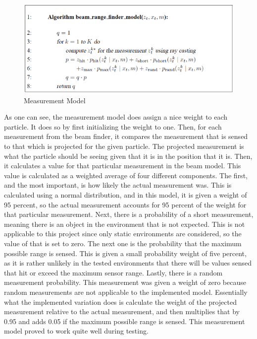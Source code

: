 \documentclass{article}
\begin{document}
\begin{figure}[h!]
\centering
\includegraphics[scale=0.70]{range_algorithm.PNG}
\caption{Measurement Model}
\label{fig:range}
\end{figure}

As one can see, the measurement model does assign a nice weight to each particle. It does so by first initializing the weight to one. Then, for each measurement from the beam finder, it compares the measurement that is sensed to that which is projected for the given particle. The projected measurement is what the particle should be seeing given that it is in the position that it is. Then, it calculates a value for that particular measurement in the beam model. This value is calculated as a weighted average of four different components. The first, and the most important, is how likely the actual measurement was. This is calculated using a normal distribution, and in this model, it is given a weight of 95 percent, so the actual measurement accounts for 95 percent of the weight for that particular measurement. Next, there is a probability of a short measurement, meaning there is an object in the environment that is not expected. This is not applicable to this project since only static environments are considered, so the value of that is set to zero. The next one is the probability that the maximum possible range is sensed. This is given a small probability weight of five percent, as it is rather unlikely in the tested environments that there will be values sensed that hit or exceed the maximum sensor range. Lastly, there is a random measurement probability. This measurement was given a weight of zero because random measurements are not applicable to the implemented model. Essentially what the implemented variation does is calculate the weight of the projected measurement relative to the actual measurement, and then multiplies that by 0.95 and adds 0.05 if the maximum possible range is sensed. This measurement model proved to work quite well during testing.\\
\end{document}
